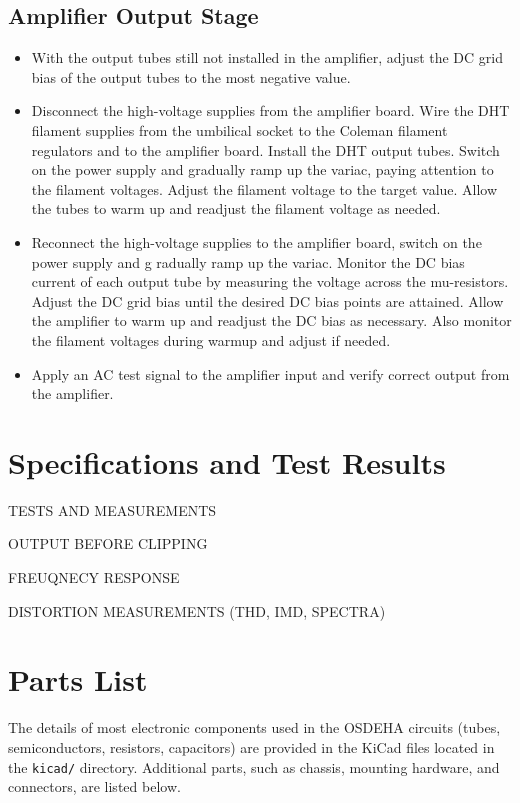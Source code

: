 \subsection{Amplifier Output Stage}
\begin{itemize}
\item With the output tubes still not installed in the amplifier, adjust the DC grid bias of the output tubes to the most negative value.
\item Disconnect the high-voltage supplies from the amplifier board. Wire the DHT filament supplies from the umbilical socket to the Coleman filament regulators and to the amplifier board. Install the DHT output tubes. Switch on the power supply and gradually ramp up the variac, paying attention to the filament voltages. Adjust the filament voltage to the target value. Allow the tubes to warm up and readjust the filament voltage as needed.
\item Reconnect the high-voltage supplies to the amplifier board, switch on the power supply and g radually ramp up the variac. Monitor the DC bias current of each output tube by measuring the voltage across the mu-resistors. Adjust the DC grid bias until the desired DC bias points are attained. Allow the amplifier to warm up and readjust the DC bias as necessary. Also monitor the filament voltages during warmup and adjust if needed.
\item Apply an AC test signal to the amplifier input and verify correct output from the amplifier.

\end{itemize}


\section{Specifications and Test Results}

TESTS AND MEASUREMENTS

OUTPUT BEFORE CLIPPING

FREUQNECY RESPONSE

DISTORTION MEASUREMENTS (THD, IMD, SPECTRA)


\section{Parts List}

The details of most electronic components used in the OSDEHA circuits (tubes, semiconductors, resistors, capacitors) are provided in the KiCad files located in the {\tt kicad/} directory.\cite{osdeha_github} Additional parts, such as chassis, mounting hardware, and connectors, are listed below.

